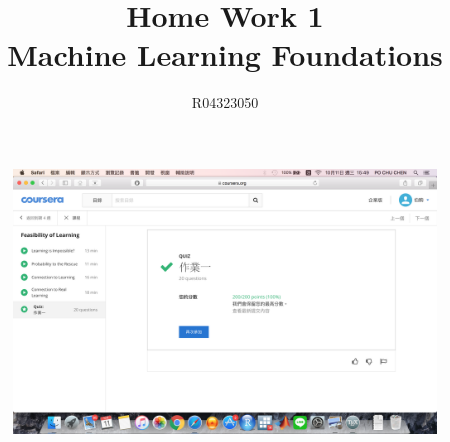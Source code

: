 \documentclass[a4paper,10pt]{article}
\title{Home Work 1\\ Machine Learning Foundations}
\author{R04323050 \\{\McQ\cH37}\z{\MbQ\cH200}\z{\MmQ\cH238}\z{\McQ\cH250}   \quad {\McQ\cH207}\z{\MdQ\cH43}\z{\MjQ\cH254}}
\date{}
\begin{document}
\maketitle
\section{}
\begin{figure}[h]
\centering
\includegraphics[scale=0.3]{Q1.png}
\end{figure}
\end{document}
